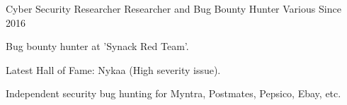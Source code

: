 \begin{cventries}
  \cventry
    {Cyber Security Researcher} %
    {Researcher and Bug Bounty Hunter} %
    {Various} %
    {Since 2016} %
    {
      \begin{cvitems} %
        \item {Bug bounty hunter at 'Synack Red Team'.}
        \item {Latest Hall of Fame: Nykaa (High severity issue).}
        \item {Independent security bug hunting for Myntra, Postmates, Pepsico, Ebay, etc.}
      \end{cvitems}
    }

\end{cventries}
